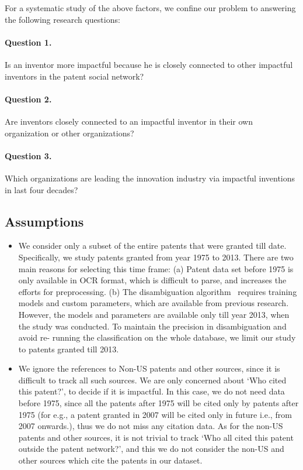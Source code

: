 For a systematic study of the above factors, we confine our problem to
answering the following research questions:

\paragraph{Question 1.} Is an inventor more impactful because he is closely
connected to other impactful inventors in the patent social network? 

\paragraph{Question  2.} Are inventors closely connected to an impactful
inventor in their own organization or other organizations? %

\paragraph{Question  3.} Which organizations are leading the innovation industry via impactful inventions in last four decades? %


\subsection{Assumptions}
\label{sec:assumptions}
	\begin{itemize}
		\item We consider only a subset of the entire patents that were granted till
		date. Specifically, we study patents granted from year 1975 to 2013. There are
		two main reasons for selecting this time frame: (a) Patent data set before
		1975 is only available in OCR format, which is difficult to parse, and
		increases the efforts for preprocessing. (b) The disambiguation
		algorithm~\cite{disambiguation}  requires training models and custom
		parameters, which are available from previous research. However, the models
		and parameters are available only till year 2013, when the study was
		conducted. To maintain the precision in disambiguation and avoid re- running
		the classification on the whole database, we limit our study to patents
		granted till 2013.
		\item We ignore the references to Non-US patents and other sources, since it
		is difficult to track all such sources.  We are only concerned about `Who
		cited this patent?', to decide if it is impactful. In this case, we do not
		need data before 1975, since all the patents after 1975 will be cited only by
		patents after 1975 (for e.g., a patent granted in 2007 will be cited only in
		future i.e., from 2007 onwards.), thus we do not miss any citation data. As
		for the non-US patents and other sources, it is not trivial to track `Who all
		cited this patent outside the patent network?', and this we do not consider
		the non-US and other sources which cite the patents in our dataset.
	\end{itemize}

